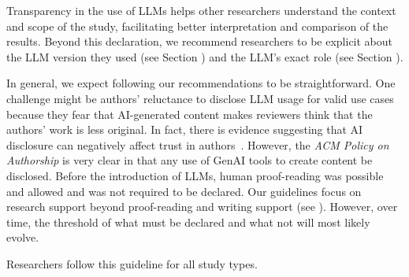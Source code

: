 
Transparency in the use of LLMs helps other researchers understand the context and scope of the study, facilitating better interpretation and comparison of the results.
Beyond this declaration, we recommend researchers to be explicit about the LLM version they used (see Section \modelversion) and the LLM's exact role (see Section \toolarchitecture).


In general, we expect following our recommendations to be straightforward.
One challenge might be authors' reluctance to disclose LLM usage for valid use cases because they fear that AI-generated content makes reviewers think that the authors' work is less original.
In fact, there is evidence suggesting that AI disclosure can negatively affect trust in authors~\cite{SCHILKE2025104405}.
However, the \emph{ACM Policy on Authorship} is very clear in that any use of GenAI tools to create content \must be disclosed.
Before the introduction of LLMs, human proof-reading was possible and allowed and was not required to be declared.
Our guidelines focus on research support beyond proof-reading and writing support (see \scope).
However, over time, the threshold of what must be declared and what not will most likely evolve.


Researchers \must follow this guideline for all study types.
